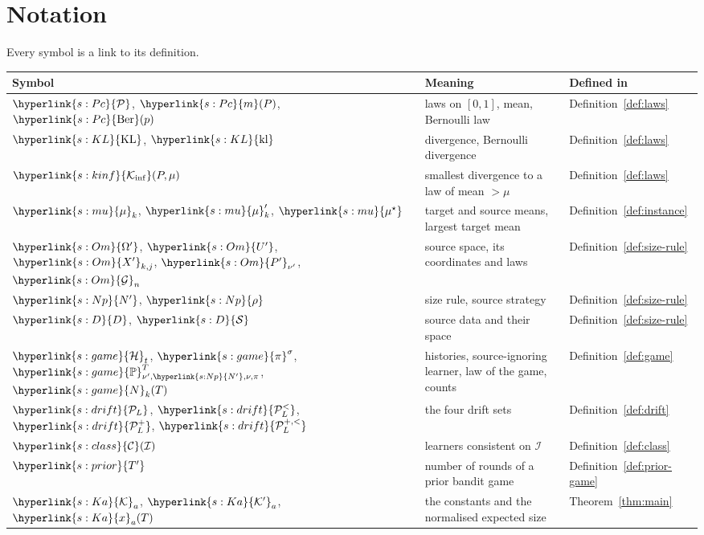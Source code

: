\documentclass[11pt]{article}
\newcommand{\sy}[2]{\hyperlink{#1}{#2}}
\newcommand{\Pc}{\sy{s:Pc}{\mathcal{P}}}
\newcommand{\m}{\sy{s:Pc}{m}}
\newcommand{\Ber}{\sy{s:Pc}{\mathrm{Ber}}}
\newcommand{\KL}{\sy{s:KL}{\mathrm{KL}}}
\newcommand{\kl}{\sy{s:KL}{\mathrm{kl}}}
\newcommand{\Kinf}{\sy{s:kinf}{\mathcal{K}_{\inf}}}
\newcommand{\mean}{\sy{s:mu}{\mu}}
\newcommand{\ms}{\sy{s:mu}{\mu^{\star}}}
\newcommand{\Om}{\sy{s:Om}{\Omega'}}
\newcommand{\Up}{\sy{s:Om}{U'}}
\newcommand{\Xp}{\sy{s:Om}{X'}}
\newcommand{\Pp}{\sy{s:Om}{P'}}
\newcommand{\Gc}{\sy{s:Om}{\mathcal{G}}}
\newcommand{\Np}{\sy{s:Np}{N'}}
\newcommand{\rhos}{\sy{s:Np}{\rho}}
\newcommand{\Sd}{\sy{s:D}{\mathcal{S}}}
\newcommand{\Dd}{\sy{s:D}{D}}
\newcommand{\Hs}{\sy{s:game}{\mathcal{H}}}
\newcommand{\pis}{\sy{s:game}{\pi}^{\sigma}}
\newcommand{\PP}{\sy{s:game}{\mathbb{P}}}
\newcommand{\Nc}{\sy{s:game}{N}}
\newcommand{\PcL}{\sy{s:drift}{\mathcal{P}_{L}}}
\newcommand{\PcLs}{\sy{s:drift}{\mathcal{P}^{<}_{L}}}
\newcommand{\PcLo}{\sy{s:drift}{\mathcal{P}^{+}_{L}}}
\newcommand{\PcLos}{\sy{s:drift}{\mathcal{P}^{+,<}_{L}}}
\newcommand{\Cl}{\sy{s:class}{\mathcal{C}}}
\newcommand{\Ka}{\sy{s:Ka}{\mathcal{K}}}
\newcommand{\Kp}{\sy{s:Ka}{\mathcal{K}'}}
\newcommand{\xr}{\sy{s:Ka}{x}}
\newcommand{\Tp}{\sy{s:prior}{T'}}
\begin{document}
\section{Notation}\label{sec:notation}

Every symbol is a link to its definition.

\begin{center}
\begin{tabular}{@{}p{}p{}p{}@{}}
\toprule
Symbol & Meaning & Defined in \\
\midrule
$\Pc$, $\m(P)$, $\Ber(p)$ & laws on $[0,1]$, mean, Bernoulli law & Definition~\ref{def:laws} \\
$\KL$, $\kl$ & divergence, Bernoulli divergence & Definition~\ref{def:laws} \\
$\Kinf(P,\mu)$ & smallest divergence to a law of mean $>\mu$ & Definition~\ref{def:laws} \\
$\mean_k$, $\mean'_k$, $\ms$ & target and source means, largest target mean & Definition~\ref{def:instance} \\
$\Om$, $\Up$, $\Xp_{k,j}$, $\Pp_{\nu'}$, $\Gc_n$ & source space, its coordinates and laws & Definition~\ref{def:size-rule} \\
$\Np$, $\rhos$ & size rule, source strategy & Definition~\ref{def:size-rule} \\
$\Dd$, $\Sd$ & source data and their space & Definition~\ref{def:size-rule} \\
$\Hs_t$, $\pis$, $\PP^T_{\nu',\Np,\nu,\pi}$, $\Nc_k(T)$ & histories, source-ignoring learner, law of the game, counts & Definition~\ref{def:game} \\
$\PcL$, $\PcLs$, $\PcLo$, $\PcLos$ & the four drift sets & Definition~\ref{def:drift} \\
$\Cl(\mathcal I)$ & learners consistent on $\mathcal I$ & Definition~\ref{def:class} \\
$\Tp$ & number of rounds of a prior bandit game & Definition~\ref{def:prior-game} \\
$\Ka_a$, $\Kp_a$, $\xr_a(T)$ & the constants and the normalised expected size & Theorem~\ref{thm:main} \\
\bottomrule
\end{tabular}
\end{center}



\end{document}
